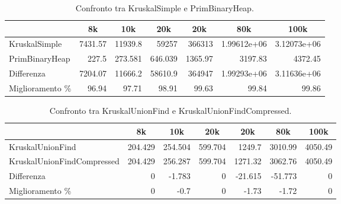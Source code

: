 \begin{table}[H]
\centering
    \begin{tabular}{|l|rrrrrr|}
    \hline
    &  \multicolumn{1}{c}{8k} & \multicolumn{1}{c}{10k} & \multicolumn{1}{c}{20k} & \multicolumn{1}{c}{20k} & \multicolumn{1}{c}{80k} &           \multicolumn{1}{c|}{100k} \\
    \hline
     KruskalSimple   & 7431.57 & 11939.8   & 59257     & 366313    &    1.99612e+06 &    3.12073e+06 \\
     PrimBinaryHeap &  227.5  &   273.581 &   646.039 &   1365.97 & 3197.83        & 4372.45        \\ \hline
     Differenza     & 7204.07 & 11666.2   & 58610.9   & 364947    &    1.99293e+06 &    3.11636e+06 \\
     Miglioramento \%  &   96.94 &    97.71  &    98.91  &     99.63 &   99.84        &   99.86        \\
    \hline
    \end{tabular}
    \caption{Confronto tra KruskalSimple e PrimBinaryHeap.}
    \label{table:kruskal-simple-vs-prim-binary-heap}
\end{table}

\begin{table}[H]
\centering
    \hspace*{-0.25cm}
    \begin{tabular}{|l|rrrrrr|}
    \hline
    &  \multicolumn{1}{c}{8k} & \multicolumn{1}{c}{10k} & \multicolumn{1}{c}{20k} & \multicolumn{1}{c}{20k} & \multicolumn{1}{c}{80k} &           \multicolumn{1}{c|}{100k} \\
    \hline
     KruskalUnionFind           & 204.429 & 254.504 & 599.704 & 1249.7   & 3010.99  & 4050.49 \\
     KruskalUnionFindCompressed & 204.429 & 256.287 & 599.704 & 1271.32  & 3062.76  & 4050.49 \\ \hline
     Differenza                 &   0     &  -1.783 &   0     &  -21.615 &  -51.773 &    0    \\
     Miglioramento \%              &   0     &  -0.7   &   0     &   -1.73  &   -1.72  &    0    \\
    \hline
    \end{tabular}
    \caption{Confronto tra KruskalUnionFind e KruskalUnionFindCompressed.}
    \label{table:kruskal-union-find-vs-kruskal-union-find-compressed}
\end{table}

